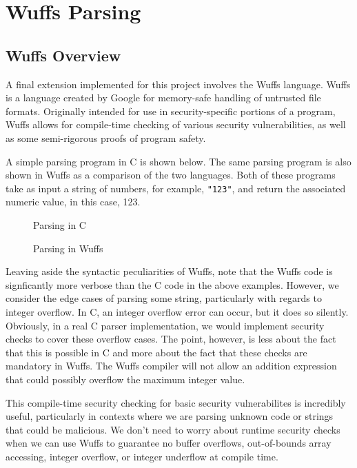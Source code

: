 \documentclass[main.tex]{subfiles}
\begin{document}
\section{Wuffs Parsing}

\subsection{Wuffs Overview}
A final extension implemented for this project involves the Wuffs language.
Wuffs is a language created by Google for memory-safe handling of untrusted file
formats. Originally intended for use in security-specific portions of a program,
Wuffs allows for compile-time checking of various security vulnerabilities, as
well as some semi-rigorous proofs of program safety.

A simple parsing program in C is shown below. The same parsing program is also
shown in Wuffs as a comparison of the two languages. Both of these programs take
as input a string of numbers, for example, \verb|"123"|, and return the
associated numeric value, in this case, 123.

\begin{singlespace}
    \begin{figure}[p!]
        
        \caption{Parsing in C}
    \end{figure}
    \begin{figure}[p!]
        
        \caption{Parsing in Wuffs}
    \end{figure}
\end{singlespace}

Leaving aside the syntactic peculiarities of Wuffs, note that the Wuffs code is
signficantly more verbose than the C code in the above examples. However, we
consider the edge cases of parsing some string, particularly with regards to
integer overflow. In C, an integer overflow error can occur, but it does so
silently. Obviously, in a real C parser implementation, we would implement
security checks to cover these overflow cases. The point, however, is less about
the fact that this is possible in C and more about the fact that these checks
are mandatory in Wuffs. The Wuffs compiler will not allow an addition expression
that could possibly overflow the maximum integer value.

This compile-time security checking for basic security vulnerabilites is
incredibly useful, particularly in contexts where we are parsing unknown code or
strings that could be malicious. We don't need to worry about runtime security
checks when we can use Wuffs to guarantee no buffer overflows, out-of-bounds 
array accessing, integer overflow, or integer underflow at compile time.
\end{document}
